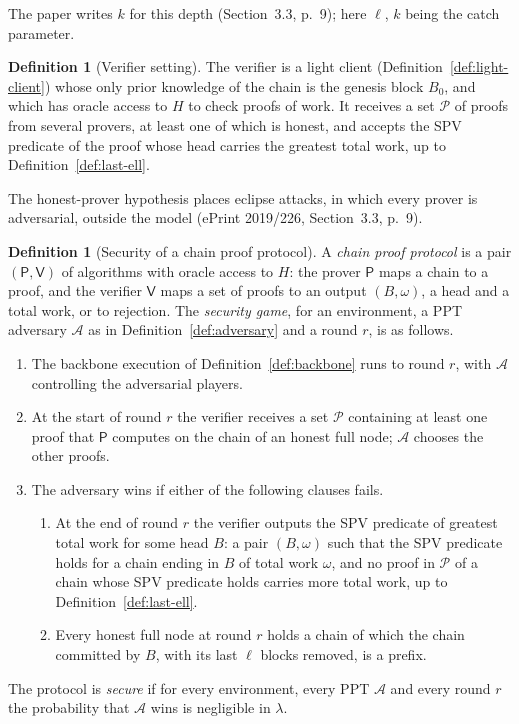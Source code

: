 \documentclass[11pt,a4paper]{article}
\theoremstyle{definition}
\newtheorem{definition}[theorem]{Definition}
\newcommand{\Adv}{\mathcal{A}}
\begin{document}
The paper writes $k$ for this depth (Section~3.3, p.~9); here $\ell$, $k$
being the catch parameter.

\begin{definition}[Verifier setting]\label{def:verifier-setting}
The verifier is a light client (Definition~\ref{def:light-client}) whose
only prior knowledge of the chain is the genesis block $B_0$, and which has
oracle access to $H$ to check proofs of work. It receives a set
$\mathcal{P}$ of proofs from several provers, at least one of which is
honest, and accepts the SPV predicate of the proof whose head carries the
greatest total work, up to Definition~\ref{def:last-ell}.
\end{definition}

The honest-prover hypothesis places eclipse attacks, in which every prover
is adversarial, outside the model (ePrint 2019/226, Section~3.3, p.~9).

\begin{definition}[Security of a chain proof protocol]\label{def:security}
A \emph{chain proof protocol} is a pair $(\mathsf{P}, \mathsf{V})$ of
algorithms with oracle access to $H$: the prover $\mathsf{P}$ maps a chain
to a proof, and the verifier $\mathsf{V}$ maps a set of proofs to an output
$(B, \omega)$, a head and a total work, or to rejection. The \emph{security
game}, for an environment, a PPT adversary $\Adv$ as in
Definition~\ref{def:adversary} and a round $r$, is as follows.
\begin{enumerate}
\item The backbone execution of Definition~\ref{def:backbone} runs to round
  $r$, with $\Adv$ controlling the adversarial players.
\item At the start of round $r$ the verifier receives a set $\mathcal{P}$
  containing at least one proof that $\mathsf{P}$ computes on the chain of
  an honest full node; $\Adv$ chooses the other proofs.
\item The adversary wins if either of the following clauses fails.
  \begin{enumerate}
  \item At the end of round $r$ the verifier outputs the SPV predicate of
    greatest total work for some head $B$: a pair $(B, \omega)$ such that
    the SPV predicate holds for a chain ending in $B$ of total work
    $\omega$, and no proof in $\mathcal{P}$ of a chain whose SPV predicate
    holds carries more total work, up to Definition~\ref{def:last-ell}.
  \item Every honest full node at round $r$ holds a chain of which the chain
    committed by $B$, with its last $\ell$ blocks removed, is a prefix.
  \end{enumerate}
\end{enumerate}
The protocol is \emph{secure} if for every environment, every PPT $\Adv$
and every round $r$ the probability that $\Adv$ wins is negligible in
$\lambda$.
\end{definition}
\end{document}
